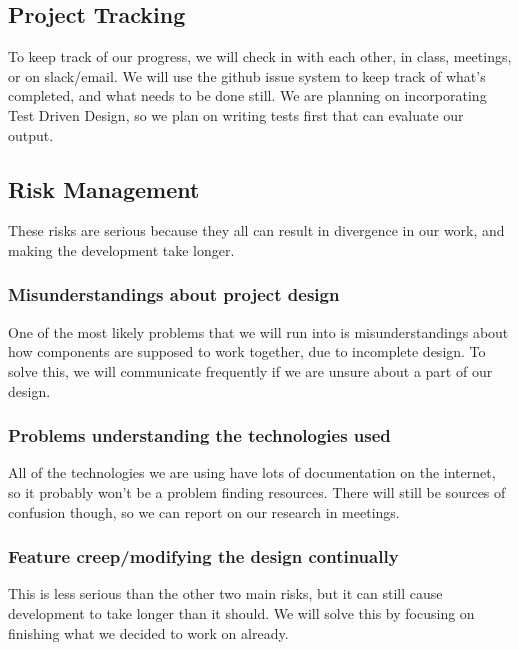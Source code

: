 

\subsection{Project Tracking}
To keep track of our progress, we will check in with each other, in class, meetings, or on slack/email. We will use the github issue system to keep track of what's completed, and what needs to be done still. We are planning on incorporating Test Driven Design, so we plan on writing tests first that can evaluate our output.


\subsection{Risk Management}
These risks are serious because they all can result in divergence in our work, and making the development take longer.
\subsubsection{Misunderstandings about project design}
One of the most likely problems that we will run into is misunderstandings about how components are supposed to work together, due to incomplete design. To solve this, we will communicate frequently if we are unsure about a part of our design.
\subsubsection{Problems understanding the technologies used}
All of the technologies we are using have lots of documentation on the internet, so it probably won't be a problem finding resources. There will still be sources of confusion though, so we can report on our research in meetings.
\subsubsection{Feature creep/modifying the design continually}
This is less serious than the other two main risks, but it can still cause development to take longer than it should. We will solve this by focusing on finishing what we decided to work on already.